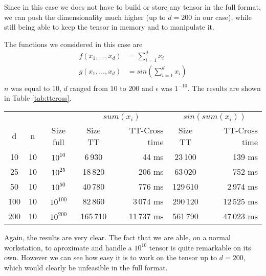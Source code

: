 Since in this case we does not have to build or store any tensor in the full format, we can push the dimensionality much higher (up to $d = 200$ in our case), while still being able to keep the tensor in memory and to manipulate it.

The functions we considered in this case are
\begin{align*}
  f(x_1,\ldots,x_d) &= \sum_{i=1}^{d} x_i\\
  g(x_1,\ldots,x_d) &= sin(\sum_{i=1}^{d} x_i)\\
\end{align*}
$n$ was equal to $10$, $d$ ranged from $10$ to $200$ and $\epsilon$ was $1^{-10}$.
The results are shown in Table \ref{tab:ttcross}.

\begin{center}
  \begin{tabular}[t]{ccccrcr}
    \toprule
      &    &           & \multicolumn{2}{c}{$sum(x_i)$} & \multicolumn{2}{c}{$sin(sum(x_i))$}\\
    d & n  & Size full & Size TT & TT-Cross time & Size TT & TT-Cross time\\ \midrule
    10  &10   &$10^{10}$      &6\,930     & 44 ms    &23\,100    & 139 ms\\
    25  &10   &$10^{25}$      &18\,820    & 206 ms    &63\,020    & 752 ms\\
    50  &10   &$10^{50}$      &40\,780    & 776 ms    &129\,610   &2\,974 ms\\
    100 &10   &$10^{100}$     &82\,860    &3\,074 ms    &290\,120   &12\,525 ms\\
    200 &10   &$10^{200}$     &165\,710   &11\,737 ms    &561\,790   &47\,023 ms\\ \bottomrule
  \end{tabular}
\end{center}

Again, the results are very clear.
The fact that we are able, on a normal workstation, to aproximate and handle a $10^{10}$ tensor is quite remarkable on its own. However we can see how easy it is to work on the tensor up to $d = 200$, which would clearly be unfeasible in the full format.

